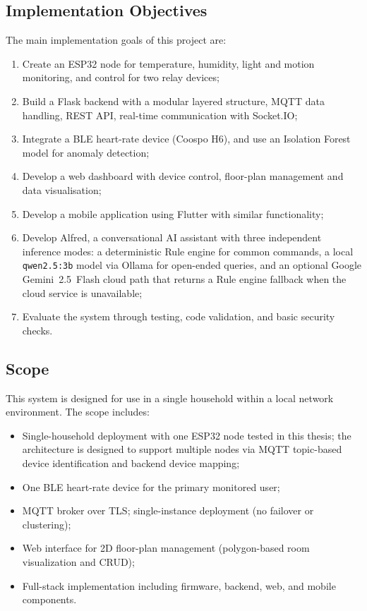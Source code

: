 \subsection{Implementation Objectives}

The main implementation goals of this project are:

\begin{enumerate}
    \item Create an ESP32 node for temperature, humidity, light and motion monitoring, and control for two relay devices;
    \item Build a Flask backend with a modular layered structure, MQTT data handling, REST API, real-time communication with Socket.IO;
    \item Integrate a BLE heart-rate device (Coospo H6), and use an Isolation Forest model for anomaly detection;
    \item Develop a web dashboard with device control, floor-plan management and data visualisation;
    \item Develop a mobile application using Flutter with similar functionality;
    \item Develop Alfred, a conversational AI assistant with three independent inference modes: a deterministic Rule engine for common commands, a local \texttt{qwen2.5:3b} model via Ollama for open-ended queries, and an optional Google Gemini~2.5~Flash cloud path that returns a Rule engine fallback when the cloud service is unavailable;
    \item Evaluate the system through testing, code validation, and basic security checks.
\end{enumerate}

\subsection{Scope}

This system is designed for use in a single household within a local
network environment. The scope includes:

\begin{itemize}
    \item Single-household deployment with one ESP32 node tested in this thesis;
          the architecture is designed to support multiple nodes via MQTT topic-based device identification
          and backend device mapping;
    \item One BLE heart-rate device for the primary monitored user;
    \item MQTT broker over TLS; single-instance deployment (no failover or clustering);
    \item Web interface for 2D floor-plan management (polygon-based room visualization and CRUD);
    \item Full-stack implementation including firmware, backend, web, and mobile components.
\end{itemize}

